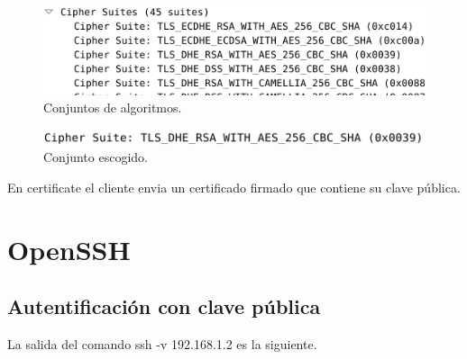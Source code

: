 \documentclass[11pt]{article}
\begin{document}
      \begin{figure}[H]
        \centering
        \includegraphics[width = \textwidth]{ciphers}
        \caption{Conjuntos de algoritmos.}
        \label{figure:ciphers}
      \end{figure}

      \begin{figure}[H]
        \centering
        \includegraphics[width = \textwidth]{cipher}
        \caption{Conjunto escogido.}
        \label{figure:cipher}
      \end{figure}

      \par
      En certificate el cliente envia un certificado firmado que contiene su
      clave pública.


  \section{OpenSSH}
    \subsection{Autentificación con clave pública}
      \par
      La salida del comando ssh -v 192.168.1.2 es la siguiente.
\end{document}
